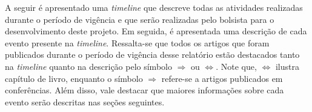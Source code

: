 A seguir é apresentado uma \textit{timeline} que descreve todas as atividades realizadas durante o período de vigência e que serão realizadas pelo bolsista para o desenvolvimento deste projeto. Em seguida, é apresentada uma descrição de cada evento presente na \textit{timeline}. Ressalta-se que todos os artigos que foram publicados durante o período de vigência desse relatório estão destacados tanto na \textit{timeline} quanto na descrição pelo símbolo $\Rightarrow$ ou $\Leftrightarrow$. Note que, $\Leftrightarrow$ ilustra capítulo de livro, enquanto o símbolo $\Rightarrow$ refere-se a artigos publicados em conferências. Além disso, vale destacar que maiores informações sobre cada evento serão descritas nas seções seguintes.

\begin{itemize}


\end{itemize}
